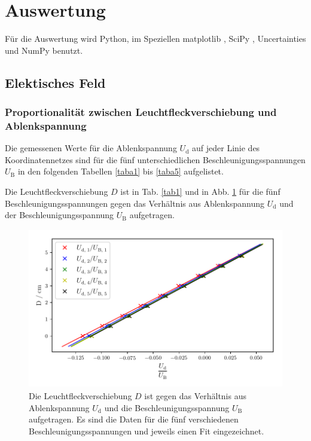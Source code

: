 \section{Auswertung}
\label{sec:Auswertung}

Für die Auswertung wird Python, im Speziellen matplotlib \cite{matplotlib}, 
SciPy \cite{scipy}, Uncertainties \cite{uncertainties}
und NumPy \cite{numpy} benutzt.

\subsection{Elektisches Feld}
\subsubsection{Proportionalität zwischen Leuchtfleckverschiebung und Ablenkspannung}
\label{sec:prop}
Die gemessenen Werte für die Ablenkspannung $U_\text{d}$
auf jeder Linie des Koordinatennetzes sind für die fünf
unterschiedlichen Beschleunigungsspannungen $U_\text{B}$
in den folgenden Tabellen \ref{taba1} bis \ref{taba5} aufgelistet.






\noindent Die Leuchtfleckverschiebung $D$ ist in Tab. \ref{tab1} und in Abb. \ref{fig:plot1}
für die fünf Beschleunigungsspannungen gegen das Verhältnis aus 
Ablenkspannung $U_\text{d}$ und der Beschleunigungsspannung $U_\text{B}$ aufgetragen.



\begin{figure}
    \centering
    \includegraphics[width=12cm, height=7cm]{build/plot1.pdf}
    \caption{Die Leuchtfleckverschiebung $D$ ist gegen das Verhältnis aus 
        Ablenkspannung $U_\text{d}$ und die Beschleunigungsspannung $U_\text{B}$ aufgetragen. Es sind die Daten
    für die fünf verschiedenen Beschleunigungsspannungen und
    jeweils einen Fit eingezeichnet.}
    \label{fig:plot1}
\end{figure}

